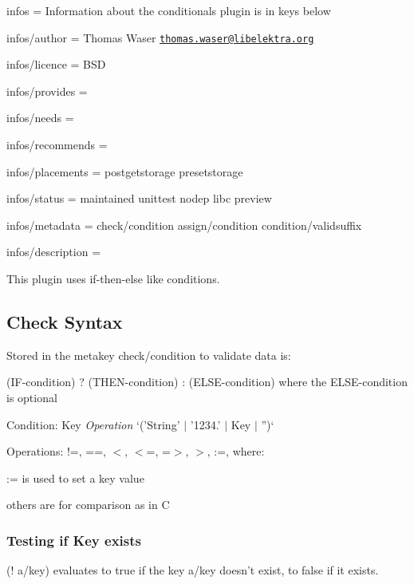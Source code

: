 
\begin{DoxyItemize}
\item infos = Information about the conditionals plugin is in keys below
\item infos/author = Thomas Waser \href{mailto:thomas.waser@libelektra.org}{\tt thomas.\+waser@libelektra.\+org}
\item infos/licence = B\+S\+D
\item infos/provides =
\item infos/needs =
\item infos/recommends =
\item infos/placements = postgetstorage presetstorage
\item infos/status = maintained unittest nodep libc preview
\item infos/metadata = check/condition assign/condition condition/validsuffix
\item infos/description =
\end{DoxyItemize}

This plugin uses if-\/then-\/else like conditions.

\subsection*{Check Syntax}

Stored in the metakey {\ttfamily check/condition} to validate data is\+:

{\ttfamily (I\+F-\/condition) ? (T\+H\+E\+N-\/condition) \+: (E\+L\+S\+E-\/condition)} where the E\+L\+S\+E-\/condition is optional

Condition\+: {\ttfamily Key} {\itshape Operation} `('String' $\vert$ '1234.' $\vert$ Key $\vert$ '')`

Operations\+: {\ttfamily !=, ==, $<$, $<$=, =$>$, $>$, \+:=}, where\+:


\begin{DoxyItemize}
\item {\ttfamily \+:=} is used to set a key value
\item others are for comparison as in C
\end{DoxyItemize}

\subsubsection*{Testing if Key exists}

{\ttfamily (! a/key)} evaluates to true if the key {\ttfamily a/key} doesn't exist, to false if it exists.

